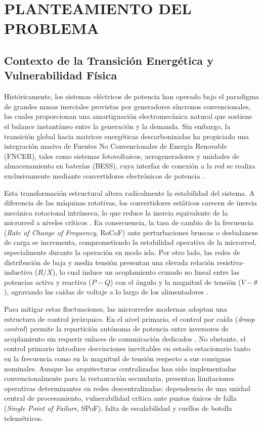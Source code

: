 \section{PLANTEAMIENTO DEL PROBLEMA}
\label{sec:problema}

\subsection{Contexto de la Transición Energética y Vulnerabilidad Física}
Históricamente, los sistemas eléctricos de potencia han operado bajo el paradigma de grandes masas inerciales provistas por generadores síncronos convencionales, las cuales proporcionan una amortiguación electromecánica natural que sostiene el balance instantáneo entre la generación y la demanda. Sin embargo, la transición global hacia matrices energéticas descarbonizadas ha propiciado una integración masiva de Fuentes No Convencionales de Energía Renovable (FNCER), tales como sistemas fotovoltaicos, aerogeneradores y unidades de almacenamiento en baterías (BESS), cuya interfaz de conexión a la red se realiza exclusivamente mediante convertidores electrónicos de potencia \citep{Mehrzad2025}.

Esta transformación estructural altera radicalmente la estabilidad del sistema. A diferencia de las máquinas rotativas, los convertidores estáticos carecen de inercia mecánica rotacional intrínseca, lo que reduce la inercia equivalente de la microrred a niveles críticos \citep{Mehrzad2025}. En consecuencia, la tasa de cambio de la frecuencia (\textit{Rate of Change of Frequency}, RoCoF) ante perturbaciones bruscas o desbalances de carga se incrementa, comprometiendo la estabilidad operativa de la microrred, especialmente durante la operación en modo isla. Por otro lado, las redes de distribución de baja y media tensión presentan una elevada relación resistiva-inductiva ($R/X$), lo cual induce un acoplamiento cruzado no lineal entre las potencias activa y reactiva ($P-Q$) con el ángulo y la magnitud de tensión ($V-\theta$), agravando las caídas de voltaje a lo largo de los alimentadores \citep{Sowa2023, Pompodakis2022Sensitivity}.

Para mitigar estas fluctuaciones, las microrredes modernas adoptan una estructura de control jerárquico. En el nivel primario, el control por caída (\textit{droop control}) permite la repartición autónoma de potencia entre inversores de acoplamiento sin requerir enlaces de comunicación dedicados \citep{Jasim2023}. No obstante, el control primario introduce desviaciones inevitables en estado estacionario tanto en la frecuencia como en la magnitud de tensión respecto a sus consignas nominales. Aunque las arquitecturas centralizadas han sido implementadas convencionalmente para la restauración secundaria, presentan limitaciones operativas determinantes en redes descentralizadas: dependencia de una unidad central de procesamiento, vulnerabilidad crítica ante puntos únicos de falla (\textit{Single Point of Failure}, SPoF), falta de escalabilidad y cuellos de botella telemétricos.

